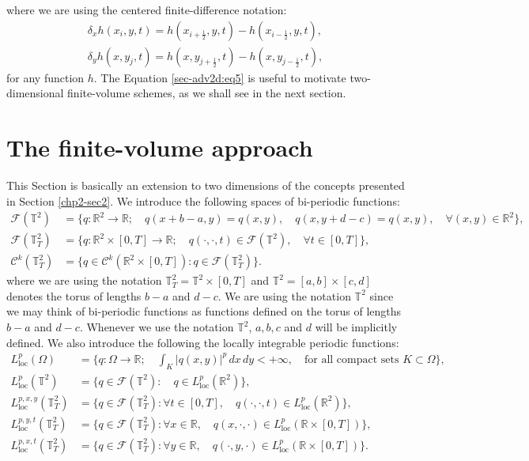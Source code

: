 where we are using the centered finite-difference notation:
\begin{align}
	\label{sec-adv2d:eq6}
	\delta_x {h}(x_i,y, t) = 
	{h}(x_{i+\frac{1}{2}}, y, t) - 
	{h}(x_{i-\frac{1}{2}}, y, t), \\
	\delta_y {h}(x, y_j,t) = 
    {h}(x, y_{j+\frac{1}{2}},t) - 
    {h}(x, y_{j-\frac{1}{2}},t),
\end{align}
for any function ${h}$. The Equation \eqref{sec-adv2d:eq5} is useful to
motivate two-dimensional finite-volume schemes, as we shall see in the next section.

\section{The finite-volume approach}
\label{sec:fv-2d}
This Section is basically an extension to two dimensions of the concepts presented in Section \ref{chp2-sec2}.
We introduce the following spaces of bi-periodic functions:
\begin{align*}
	\mathcal{F}(\mathbb{T}^2) &= \{q:\mathbb{R}^2 \to \mathbb{R};
	\quad q(x+b-a,y) = q(x,y), \quad q(x,y+d-c) = q(x,y),\quad \forall (x,y) \in \mathbb{R}^2\},\\
	\mathcal{F}(\mathbb{T}^2_{T}) &= \{q:\mathbb{R}^2\times[0,T]\to \mathbb{R};\quad q(\cdot,\cdot,t) \in \mathcal{F}(\mathbb{T}^2), \quad \forall t \in [0,T]\},\\
	\mathcal{C}^k(\mathbb{T}^2_{T}) &= \{q\in \mathcal{C}^k(\mathbb{R}^2\times[0,T]): q \in \mathcal{F}(\mathbb{T}^2_{T})\}.
\end{align*}
where we are using the notation $\mathbb{T}^2_{T} = \mathbb{T}^2\times[0,T]$ and $\mathbb{T}^2 = [a,b] \times [c,d]$ denotes the torus of lengths $b-a$ and $d-c$.
We are using the notation $\mathbb{T}^2$ since we may think of bi-periodic functions as functions defined on the torus of lengths $b-a$ and $d-c$.
Whenever we use the notation $\mathbb{T}^2$, $a, b, c$ and $d$ will be implicitly defined.
We also introduce the following the locally integrable periodic functions:
\begin{align*}
	L^p_{\text{loc}}(\Omega) &= \{q:\Omega\to \mathbb{R};\quad \int_{K} |q(x,y)|^p\,dx\,dy  < +\infty, \quad \text{for all compact sets } K \subset \Omega\},\\
	{L}^{p}_{\text{loc}}(\mathbb{T}^2) &= \{q\in \mathcal{F}(\mathbb{T}^2): \quad  q \in L^p_{\text{loc}}(\mathbb{R}^2)\},\\
	{L}^{p,x,y}_{\text{loc}}(\mathbb{T}^2_{T}) &= \{q\in \mathcal{F}(\mathbb{T}^2_{T}): \forall t \in [0,T], \quad q(\cdot,\cdot,t) \in L^p_{\text{loc}}(\mathbb{R}^2)\},\\
	{L}^{p,y,t}_{\text{loc}}(\mathbb{T}^2_{T}) &= \{q\in \mathcal{F}(\mathbb{T}^2_{T}): \forall x \in \mathbb{R},\quad q(x,\cdot,\cdot) \in L^p_{\text{loc}}(\mathbb{R}\times [0,T])\},\\
	{L}^{p,x,t}_{\text{loc}}(\mathbb{T}^2_{T}) &= \{q\in \mathcal{F}(\mathbb{T}^2_{T}): \forall y \in \mathbb{R},\quad q(\cdot,y,\cdot) \in L^p_{\text{loc}}(\mathbb{R}\times [0,T])\}.\\
\end{align*}

